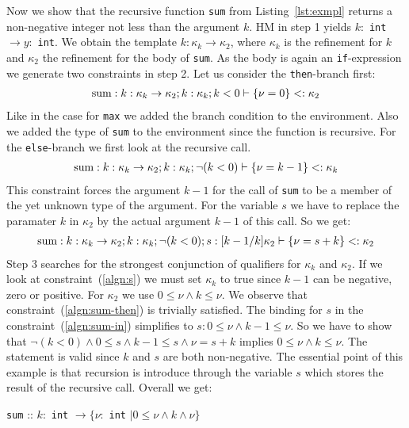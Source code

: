 \documentclass[a4paper,UKenglish]{lipics-v2016}
\begin{document}
Now we show that the recursive function \lstinline{sum} from Listing~\ref{lst:exmpl} returns a non-negative integer not less than the argument $k$.
HM in step 1 yields $k:$ \lstinline{int} $\rightarrow y:$ \lstinline{int}.
We obtain the template $k: \kappa_k \rightarrow \kappa_2$, where $\kappa_k$ is the refinement for $k$ and $\kappa_2$ the refinement for the body of \lstinline{sum}.
As the body is again an \lstinline{if}-expression we generate two constraints in step 2.
Let us consider the \lstinline{then}-branch first:
\begin{align}
    \label{algn:sum-then}
    \text{\lstinline|sum|}: k: \kappa_k \rightarrow \kappa_2; k: \kappa_k; k < 0 \vdash \{\nu = 0\} <: \kappa_2
\end{align}
Like in the case for \lstinline{max} we added the branch condition to the environment.
Also we added the type of \lstinline{sum} to the environment since the function is recursive.
For the \lstinline{else}-branch we first look at the recursive call.
\begin{align}
    \label{algn:s}
    \text{\lstinline|sum|}: k: \kappa_k \rightarrow \kappa_2; k: \kappa_k; \neg(k < 0) \vdash \{\nu = k - 1\} <: \kappa_k
\end{align}
This constraint forces the argument $k - 1$ for the call of \lstinline{sum} to be a member of the yet unknown type of the argument.
For the variable $s$ we have to replace the paramater $k$ in $\kappa_2$ by the actual argument $k - 1$ of this call.
So we get:
\begin{align}
    \label{algn:sum-in}
    \text{\lstinline|sum|}: k: \kappa_k \rightarrow \kappa_2; k: \kappa_k; \neg(k < 0); s: [k-1/k]\kappa_2 \vdash \{\nu = s + k\} <: \kappa_2
\end{align}
Step 3 searches for the strongest conjunction of qualifiers for $\kappa_k$ and $\kappa_2$.
If we look at constraint~(\ref{algn:s}) we must set $\kappa_k$ to true since $k - 1$ can be negative, zero or positive.
For $\kappa_2$ we use $0 \le \nu \land k \le \nu$.
We observe that constraint~(\ref{algn:sum-then}) is trivially satisfied.
The binding for $s$ in the constraint~(\ref{algn:sum-in}) simplifies to $s: 0 \le \nu \land k - 1 \le \nu$.
So we have to show that $\neg(k < 0) \land 0 \le s \land k - 1 \le s \land \nu = s + k$ implies $0 \le \nu \land k \le \nu$.
The statement is valid since $k$ and $s$ are both non-negative.
The essential point of this example is that recursion is introduce through the variable $s$ which stores the result of the recursive call.
Overall we get:
\begin{center}
    \lstinline{sum} :: $k:$ \lstinline{int} $\rightarrow \{\nu:$ \lstinline{int} $\mid 0 \le \nu \land k \land \nu \}$
\end{center}
\end{document}

